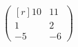 \documentclass[a4paper]{article}
\begin{document}
\[
\begin{pmatrix*}[r]
    10&11\\
    1&2\\
    -5&-6
\end{pmatrix*}
\]
\end{document}

